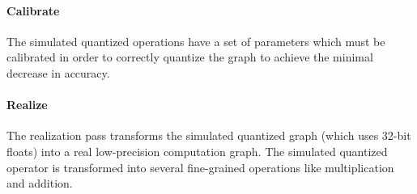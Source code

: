 
\paragraph{Calibrate}
The simulated quantized operations have a set of parameters which must
  be calibrated in order to correctly quantize the graph to achieve the
  minimal decrease in accuracy.

\paragraph{Realize}
The realization pass transforms the simulated quantized graph
  (which uses 32-bit floats)
  into a real low-precision computation graph.
The simulated quantized operator is transformed
  into several fine-grained operations like multiplication and addition.

